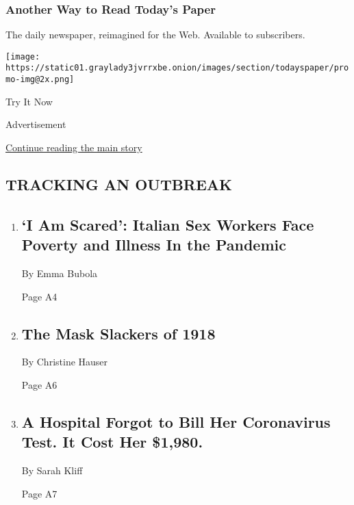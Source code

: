 \hypertarget{another-way-to-read-todays-paper}{%
\subsubsection{Another Way to Read Today's
Paper}\label{another-way-to-read-todays-paper}}

The daily newspaper, reimagined for the Web. Available to subscribers.

\texttt{[image: https://static01.graylady3jvrrxbe.onion/images/section/todayspaper/promo-img@2x.png]}

Try It Now

Advertisement

\protect\hyperlink{after-mid1}{Continue reading the main story}

\hypertarget{tracking-an-outbreak}{%
\subsection{TRACKING AN OUTBREAK}\label{tracking-an-outbreak}}

\begin{enumerate}
\def\labelenumi{\arabic{enumi}.}
\item
  \href{/2020/08/03/world/europe/italy-coronavirus-prostitution-sex-work.html}{}

  \hypertarget{i-am-scared-italian-sex-workers-face-poverty-and-illness-in-the-pandemic}{%
  \subsection{`I Am Scared': Italian Sex Workers Face Poverty and
  Illness In the
  Pandemic}\label{i-am-scared-italian-sex-workers-face-poverty-and-illness-in-the-pandemic}}

  By Emma Bubola

  Page A4
\item
  \href{/2020/08/03/us/mask-protests-1918.html}{}

  \hypertarget{the-mask-slackers-of-1918-1}{%
  \subsection{The Mask Slackers of
  1918}\label{the-mask-slackers-of-1918-1}}

  By Christine Hauser

  Page A6
\item
  \href{/2020/08/03/upshot/nj-coronavirus-medical-bill.html}{}

  \hypertarget{a-hospital-forgot-to-bill-her-coronavirus-test-it-cost-her-1980}{%
  \subsection{A Hospital Forgot to Bill Her Coronavirus Test. It Cost
  Her
  \$1,980.}\label{a-hospital-forgot-to-bill-her-coronavirus-test-it-cost-her-1980}}

  By Sarah Kliff

  Page A7
\end{enumerate}

